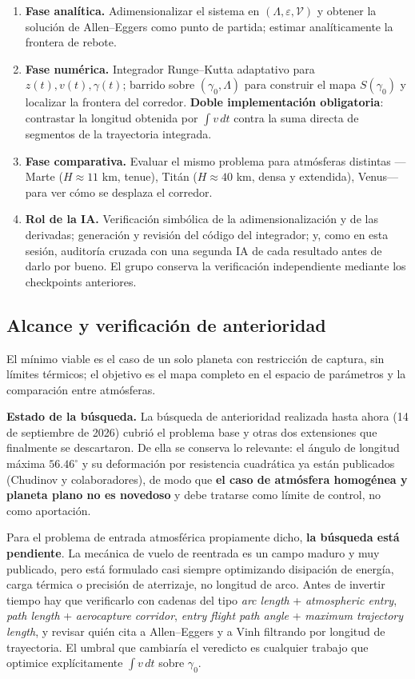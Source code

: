 \begin{enumerate}
    \item \textbf{Fase analítica.} Adimensionalizar el sistema en \((\Lambda,\varepsilon,\mathcal{V})\) y obtener la solución de Allen--Eggers como punto de partida; estimar analíticamente la frontera de rebote.
    \item \textbf{Fase numérica.} Integrador Runge--Kutta adaptativo para \(z(t),v(t),\gamma(t)\); barrido sobre \((\gamma_0,\Lambda)\) para construir el mapa \(S(\gamma_0)\) y localizar la frontera del corredor. \textbf{Doble implementación obligatoria}: contrastar la longitud obtenida por \(\int v\,dt\) contra la suma directa de segmentos de la trayectoria integrada.
    \item \textbf{Fase comparativa.} Evaluar el mismo problema para atmósferas distintas ---Marte (\(H\approx11\) km, tenue), Titán (\(H\approx40\) km, densa y extendida), Venus--- para ver cómo se desplaza el corredor.
    \item \textbf{Rol de la IA.} Verificación simbólica de la adimensionalización y de las derivadas; generación y revisión del código del integrador; y, como en esta sesión, auditoría cruzada con una segunda IA de cada resultado antes de darlo por bueno. El grupo conserva la verificación independiente mediante los checkpoints anteriores.
\end{enumerate}

\subsection{Alcance y verificación de anterioridad}

El mínimo viable es el caso de un solo planeta con restricción de captura, sin límites térmicos; el objetivo es el mapa completo en el espacio de parámetros y la comparación entre atmósferas.

\textbf{Estado de la búsqueda.} La búsqueda de anterioridad realizada hasta ahora (14 de septiembre de 2026) cubrió el problema base y otras dos extensiones que finalmente se descartaron. De ella se conserva lo relevante: el ángulo de longitud máxima \(56.46^\circ\) y su deformación por resistencia cuadrática ya están publicados (Chudinov y colaboradores), de modo que \textbf{el caso de atmósfera homogénea y planeta plano no es novedoso} y debe tratarse como límite de control, no como aportación.

Para el problema de entrada atmosférica propiamente dicho, \textbf{la búsqueda está pendiente}. La mecánica de vuelo de reentrada es un campo maduro y muy publicado, pero está formulado casi siempre optimizando disipación de energía, carga térmica o precisión de aterrizaje, no longitud de arco. Antes de invertir tiempo hay que verificarlo con cadenas del tipo \textit{arc length} + \textit{atmospheric entry}, \textit{path length} + \textit{aerocapture corridor}, \textit{entry flight path angle} + \textit{maximum trajectory length}, y revisar quién cita a Allen--Eggers y a Vinh filtrando por longitud de trayectoria. El umbral que cambiaría el veredicto es cualquier trabajo que optimice explícitamente \(\int v\,dt\) sobre \(\gamma_0\).

